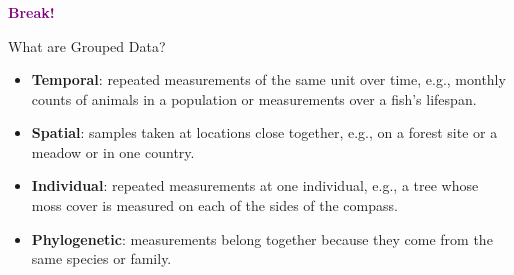 \documentclass{beamer}
\begin{document}
\begin{frame}
  \frametitle{}
  \begin{center}
    \huge\textbf{\textcolor{purple}{Break!}}
  \end{center}
\end{frame}

\begin{frame}{What are Grouped Data?}
  \begin{itemize}
    \item \textbf{Temporal}: repeated measurements of the same unit over time, e.g., monthly counts of animals in a population or measurements over a fish's lifespan.
    \item \textbf{Spatial}: samples taken at locations close together, e.g., on a forest site or a meadow or in one country.
    \item \textbf{Individual}: repeated measurements at one individual, e.g., a tree whose moss cover is measured on each of the sides of the compass.
    \item \textbf{Phylogenetic}: measurements belong together because they come from the same species or family.
  \end{itemize}
\end{frame}
\end{document}
